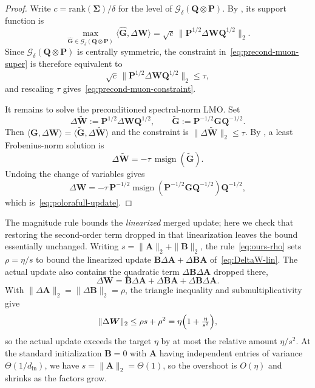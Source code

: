 \documentclass{article}
\newcommand{\mat}[1]{\bm{#1}}
\newcommand{\ip}[1]{\langle #1 \rangle}
\DeclareMathOperator{\msign}{msign}          %
\newcommand{\norm}[1]{\| #1\|}
\begin{document}
\precomuon*
\begin{proof}
Write $c=\mathrm{rank}(\mat{\Sigma})/\delta$ for the level of $\mathcal{G}_\delta(\mat{Q}\otimes \mat{P})$. By , its support function is
\[
  \max_{\widehat{\mat{G}}\in\mathcal{G}_\delta(\mat{Q}\otimes \mat{P})}
  \ip{\widehat{\mat{G}},\Delta\mat{W}}
  =\sqrt c\,\norm{\mat{P}^{1/2}\Delta\mat{W} \mat{Q}^{1/2}}_2 .
\]
Since $\mathcal{G}_\delta(\mat{Q}\otimes \mat{P})$ is centrally symmetric, the constraint in~\eqref{eq:precond-muon-super} is therefore equivalent to
\[
  \sqrt c\,\norm{\mat{P}^{1/2}\Delta\mat{W} \mat{Q}^{1/2}}_2\le\tau,
\]
and rescaling $\tau$ gives~\eqref{eq:precond-muon-constraint}.

It remains to solve the preconditioned spectral-norm LMO. Set
\[
  \Delta\widetilde{\mat{W}} := \mat{P}^{1/2}\Delta\mat{W} \mat{Q}^{1/2},
  \qquad
  \widetilde{\mat{G}} := \mat{P}^{-1/2}\mat{G}\mat{Q}^{-1/2}.
\]
Then $\ip{\mat{G},\Delta\mat{W}}=\ip{\widetilde{\mat{G}},\Delta\widetilde{\mat{W}}}$ and the constraint is
$\norm{\Delta\widetilde{\mat{W}}}_2\le\tau$. By , a least Frobenius-norm solution is
\[
  \Delta\widetilde{\mat{W}}
  =
  -\tau\,\msign(\widetilde{\mat{G}}).
\]
Undoing the change of variables gives
\[
  \Delta\mat{W}
  =
  -\tau\,
  \mat{P}^{-1/2}\msign(\mat{P}^{-1/2}\mat{G}\mat{Q}^{-1/2})\mat{Q}^{-1/2},
\]
which is~\eqref{eq:polorafull-update}.
\end{proof}

\begin{remark}
\label{rem:quadratic}
The magnitude rule bounds the \emph{linearized} merged update; here we check that
restoring the second-order term dropped in that linearization leaves the bound
essentially unchanged. Writing $s=\norm{\mat{A}}_2+\norm{\mat{B}}_2$, the
rule~\eqref{eq:ours-rho} sets $\rho=\eta/s$ to bound the linearized update
$\mat{B}\Delta\mat{A}+\Delta\mat{B} \mat{A}$ of~\eqref{eq:DeltaW-lin}. The actual update also contains
the quadratic term $\Delta\mat{B}\Delta\mat{A}$ dropped there,
\[
  \Delta\mat{W} = \mat{B}\Delta\mat{A}+\Delta\mat{B} \mat{A}+\Delta\mat{B}\Delta\mat{A} .
\]
With $\norm{\Delta\mat{A}}_2=\norm{\Delta\mat{B}}_2=\rho$, the triangle inequality and
submultiplicativity give
\[
  \norm{\Delta\mat{W}}_2\le\rho s+\rho^2=\eta\Bigl(1+\tfrac{\eta}{s^2}\Bigr),
\]
so the actual update exceeds the target $\eta$ by at most the relative amount
$\eta/s^2$. At the standard initialization $\mat{B}=0$ with $\mat{A}$ having independent
entries of variance $\Theta(1/d_{\mathrm{in}})$, we have $s=\norm{\mat{A}}_2=\Theta(1)$,
so the overshoot is $O(\eta)$ and shrinks as the factors grow.
\end{remark}
\end{document}
